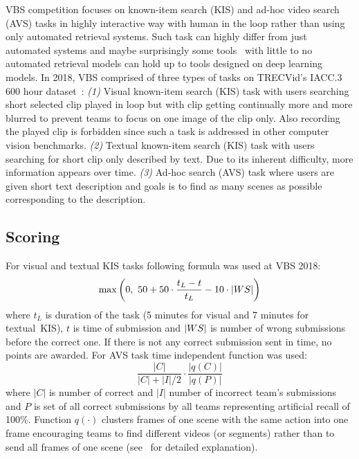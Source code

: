 VBS competition focuses on known-item search (KIS) and ad-hoc video search (AVS) tasks in highly interactive
way with human in the loop rather than using only automated retrieval systems. Such task can highly differ from just automated systems and maybe surprisingly some tools~\cite{Storyboard-Based_Interface,duane2018virtual} with little to no automated retrieval models can hold up to tools designed on deep learning models. In 2018, VBS comprised of three types of tasks on TRECVid's IACC.3 600 hour dataset~\cite{awad2016trecvid}: \textit{(1)} Visual known-item search (KIS) task with users searching short selected clip played in loop but with clip getting continually more and more blurred to prevent teams to focus on one image of the clip only. Also recording the played clip is forbidden since such a task is addressed in other computer vision benchmarks. \textit{(2)} Textual known-item search (KIS) task with users searching for short clip only described by text. Due to its inherent difficulty, more information appears over time. \textit{(3)} Ad-hoc search (AVS) task where users are given short text description and goals is to find as many scenes as possible corresponding to the description.

\subsection{Scoring}
For visual and textual KIS tasks following formula was used at VBS 2018:
\begin{equation}
\max\left(0,\ 50 + 50\cdot\frac{t_L-t}{t_L} - 10\cdot\left|{WS}\right|\right)
\end{equation}
where $t_L$ is duration of the task (5 minutes for visual and 7 minutes for textual~KIS), $t$ is time of submission and $\left|{WS}\right|$ is number of wrong submissions before the correct one. If there is not any correct submission sent in time, no points are awarded. For AVS task time independent function was used:
\begin{equation}
\frac{|C|}{|C|+|I|/2}\cdot\frac{|q(C)|}{|q(P)|}
\end{equation}
where $|C|$ is number of correct and $|I|$ number of incorrect team's submissions and $P$ is set of all correct submissions by all teams representing artificial recall of 100\%. Function $q(\cdot)$ clusters frames of one scene with the same action into one frame encouraging teams to find different videos (or segments) rather than to send all frames of one scene (see~\cite{Lokoc-influential-trends} for detailed explanation).

